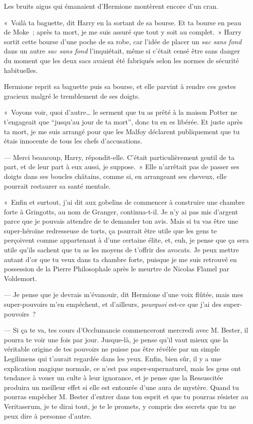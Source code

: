 Les bruits aigus qui émanaient d'Hermione montèrent encore d'un cran.

«~Voilà ta baguette, dit Harry en la sortant de sa bourse. Et ta bourse en peau de Moke~; après ta mort, je me suis assuré que tout y soit au complet.~» Harry sortit cette bourse d'une poche de sa robe, car l'idée de placer un \emph{sac sans fond} dans un autre \emph{sac sans fond} l'inquiétait, même si c'était censé être sans danger du moment que les deux sacs avaient été fabriqués selon les normes de sécurité habituelles.

Hermione reprit sa baguette puis sa bourse, et elle parvint à rendre ces gestes gracieux malgré le tremblement de ses doigts.

«~Voyons voir, quoi d'autre… le serment que tu as prêté à la maison Potter ne t'engageait que “jusqu'au jour de ta mort”, donc tu en es libérée. Et juste après ta mort, je me suis arrangé pour que les Malfoy déclarent publiquement que tu étais innocente de tous les chefs d'accusations.

--- Merci beaucoup, Harry, répondit-elle. C'était particulièrement gentil de ta part, et de leur part à eux aussi, je suppose.~» Elle n'arrêtait pas de passer ses doigts dans ses boucles châtains, comme si, en arrangeant ses cheveux, elle pourrait restaurer sa santé mentale.

«~Enfin et surtout, j'ai dit aux gobelins de commencer à construire une chambre forte à Gringotts, au nom de Granger, continua-t-il. Je n'y ai pas mis d'argent parce que je pouvais attendre de te demander ton avis. Mais si tu vas être une super-héroïne redresseuse de torts, ça pourrait être utile que les gens te perçoivent comme appartenant à d'une certaine élite, et, euh, je pense que ça sera utile qu'ils sachent que tu as les moyens de t'offrir des avocats. Je peux mettre autant d'or que tu veux dans ta chambre forte, puisque je me suis retrouvé en possession de la Pierre Philosophale après le meurtre de Nicolas Flamel par Voldemort.

--- Je pense que je devrais m'évanouir, dit Hermione d'une voix flûtée, mais mes super-pouvoirs m'en empêchent, et d'ailleurs, \emph{pourquoi} est-ce que j'ai des super-pouvoirs~?

--- Si ça te va, tes cours d'Occlumancie commenceront mercredi avec M. Bester, il pourra te voir une fois par jour. Jusque-là, je pense qu'il vaut mieux que la véritable origine de tes pouvoirs ne puisse pas être révélée par un simple Legilimens qui t'aurait regardée dans les yeux. Enfin, bien sûr, il y a une explication magique normale, ce n'est pas super-supernaturel, mais les gens ont tendance à vouer un culte à leur ignorance, et je pense que la Ressuscitée produira un meilleur effet si elle est entourée d'une aura de mystère. Quand tu pourras empêcher M. Bester d'entrer dans ton esprit et que tu pourras résister au Veritaserum, je te dirai tout, je te le promets, y compris des secrets que tu ne peux dire à personne d'autre.

